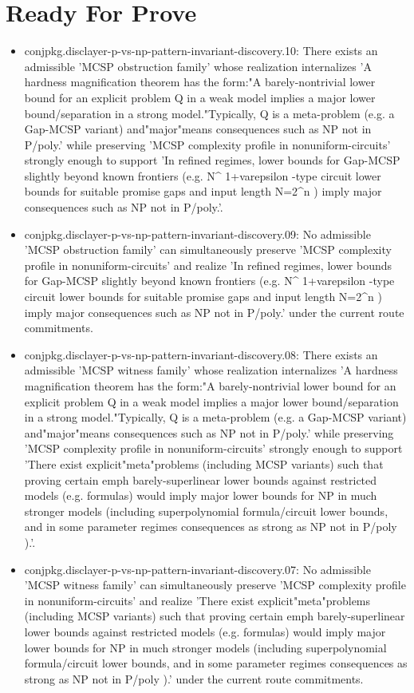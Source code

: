 \documentclass[11pt]{article}
\begin{document}
\section*{Ready For Prove}
\begin{itemize}
\item conjpkg.disclayer-p-vs-np-pattern-invariant-discovery.10: There exists an admissible 'MCSP obstruction family' whose realization internalizes 'A hardness magnification theorem has the form:"A barely-nontrivial lower bound for an explicit problem Q in a weak model implies a major lower bound/separation in a strong model."Typically, Q is a meta-problem (e.g. a Gap-MCSP variant) and"major"means consequences such as NP not in P/poly.' while preserving 'MCSP complexity profile in nonuniform-circuits' strongly enough to support 'In refined regimes, lower bounds for Gap-MCSP slightly beyond known frontiers (e.g. N\textasciicircum{} 1+varepsilon -type circuit lower bounds for suitable promise gaps and input length N=2\textasciicircum{}n ) imply major consequences such as NP not in P/poly.'.
\item conjpkg.disclayer-p-vs-np-pattern-invariant-discovery.09: No admissible 'MCSP obstruction family' can simultaneously preserve 'MCSP complexity profile in nonuniform-circuits' and realize 'In refined regimes, lower bounds for Gap-MCSP slightly beyond known frontiers (e.g. N\textasciicircum{} 1+varepsilon -type circuit lower bounds for suitable promise gaps and input length N=2\textasciicircum{}n ) imply major consequences such as NP not in P/poly.' under the current route commitments.
\item conjpkg.disclayer-p-vs-np-pattern-invariant-discovery.08: There exists an admissible 'MCSP witness family' whose realization internalizes 'A hardness magnification theorem has the form:"A barely-nontrivial lower bound for an explicit problem Q in a weak model implies a major lower bound/separation in a strong model."Typically, Q is a meta-problem (e.g. a Gap-MCSP variant) and"major"means consequences such as NP not in P/poly.' while preserving 'MCSP complexity profile in nonuniform-circuits' strongly enough to support 'There exist explicit"meta"problems (including MCSP variants) such that proving certain emph barely-superlinear lower bounds against restricted models (e.g. formulas) would imply major lower bounds for NP in much stronger models (including superpolynomial formula/circuit lower bounds, and in some parameter regimes consequences as strong as NP not in P/poly ).'.
\item conjpkg.disclayer-p-vs-np-pattern-invariant-discovery.07: No admissible 'MCSP witness family' can simultaneously preserve 'MCSP complexity profile in nonuniform-circuits' and realize 'There exist explicit"meta"problems (including MCSP variants) such that proving certain emph barely-superlinear lower bounds against restricted models (e.g. formulas) would imply major lower bounds for NP in much stronger models (including superpolynomial formula/circuit lower bounds, and in some parameter regimes consequences as strong as NP not in P/poly ).' under the current route commitments.

\end{itemize}
\end{document}
